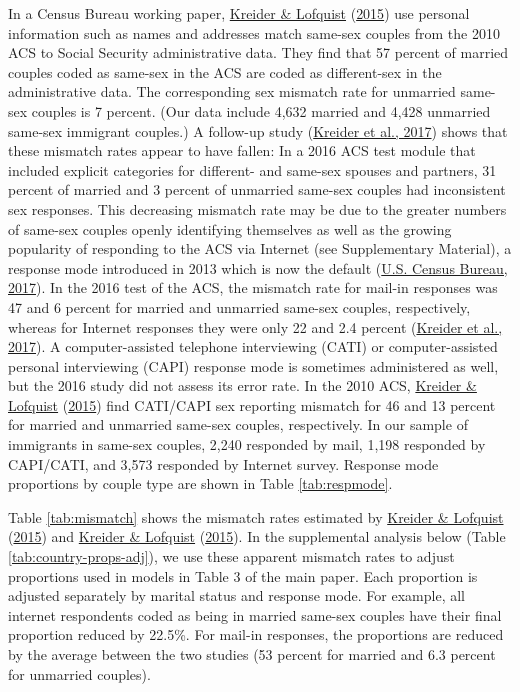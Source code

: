\documentclass[
  11pt,
]{article}
\begin{document}
In a Census Bureau working paper, \protect\hyperlink{ref-kreider_2015}{Kreider \& Lofquist} (\protect\hyperlink{ref-kreider_2015}{2015}) use personal information such as names and addresses match same-sex couples from the 2010 ACS to Social Security administrative data. They find that 57 percent of married couples coded as same-sex in the ACS are coded as different-sex in the administrative data. The corresponding sex mismatch rate for unmarried same-sex couples is 7 percent. (Our data include 4,632 married and 4,428 unmarried same-sex immigrant couples.) A follow-up study (\protect\hyperlink{ref-kreider_2017}{Kreider et al., 2017}) shows that these mismatch rates appear to have fallen: In a 2016 ACS test module that included explicit categories for different- and same-sex spouses and partners, 31 percent of married and 3 percent of unmarried same-sex couples had inconsistent sex responses. This decreasing mismatch rate may be due to the greater numbers of same-sex couples openly identifying themselves as well as the growing popularity of responding to the ACS via Internet (see Supplementary Material), a response mode introduced in 2013 which is now the default (\protect\hyperlink{ref-u.s.censusbureau_2017}{U.S. Census Bureau, 2017}). In the 2016 test of the ACS, the mismatch rate for mail-in responses was 47 and 6 percent for married and unmarried same-sex couples, respectively, whereas for Internet responses they were only 22 and 2.4 percent (\protect\hyperlink{ref-kreider_2017}{Kreider et al., 2017}). A computer-assisted telephone interviewing (CATI) or computer-assisted personal interviewing (CAPI) response mode is sometimes administered as well, but the 2016 study did not assess its error rate. In the 2010 ACS, \protect\hyperlink{ref-kreider_2015}{Kreider \& Lofquist} (\protect\hyperlink{ref-kreider_2015}{2015}) find CATI/CAPI sex reporting mismatch for 46 and 13 percent for married and unmarried same-sex couples, respectively. In our sample of immigrants in same-sex couples, 2,240 responded by mail, 1,198 responded by CAPI/CATI, and 3,573 responded by Internet survey. Response mode proportions by couple type are shown in Table \ref{tab:respmode}.

Table \ref{tab:mismatch} shows the mismatch rates estimated by \protect\hyperlink{ref-kreider_2015}{Kreider \& Lofquist} (\protect\hyperlink{ref-kreider_2015}{2015}) and \protect\hyperlink{ref-kreider_2015}{Kreider \& Lofquist} (\protect\hyperlink{ref-kreider_2015}{2015}). In the supplemental analysis below (Table \ref{tab:country-props-adj}), we use these apparent mismatch rates to adjust proportions used in models in Table 3 of the main paper. Each proportion is adjusted separately by marital status and response mode. For example, all internet respondents coded as being in married same-sex couples have their final proportion reduced by 22.5\%. For mail-in responses, the proportions are reduced by the average between the two studies (53 percent for married and 6.3 percent for unmarried couples).
\end{document}
